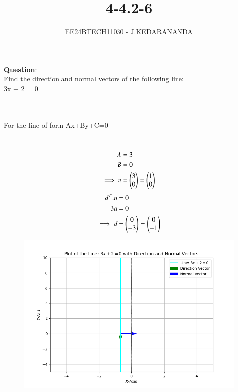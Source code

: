 \documentclass[journal]{IEEEtran}
\numberwithin{equation}{enumi}
\numberwithin{figure}{enumi}
\begin{document}

\title{4-4.2-6}
\author{EE24BTECH11030 - J.KEDARANANDA}
{\let\newpage\relax\maketitle}
\textbf{Question}:\\
Find the direction and normal vectors of the following line:\\
3x + 2 = 0
\\
\solution \\
\begin{table}[!ht]
  \centering
  
  \caption{}
  \label{tabQuestion-4-4.2-6-1}
\end{table}\\
For the line of form Ax+By+C=0 
\begin{table}[!ht]
  \centering
  
  \caption{}
  \label{tabQuestion-4-4.2-6-2}
\end{table}\\
\begin{align}
    A&=3\\
    B&=0\\
    \implies n&=\begin{pmatrix}3\\0\end{pmatrix} = \begin{pmatrix}1\\0\end{pmatrix}
\end{align}
\begin{align}
    d^T.n&=0\\
    3a&=0\\
    \implies d&=\begin{pmatrix}0\\-3\end{pmatrix} = \begin{pmatrix}0\\-1\end{pmatrix}
\end{align}
\begin{figure}[!ht]
    \centering
    \includegraphics[width=\linewidth]{figs/fig1.png}
    \caption{}
\end{figure}
\end{document}
